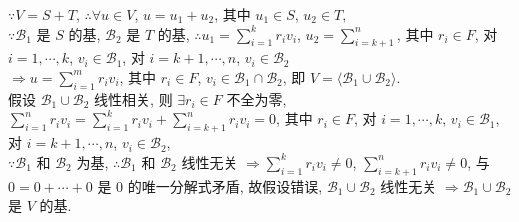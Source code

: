 \documentclass{note}
\begin{document}
\begin{pf}
\begin{itemize}
        $\because V=S+T$, $\therefore\forall u\in V$, $u=u_1+u_2$, 其中 $u_1\in S$, $u_2\in T$,\\
        $\because\mathcal{B}_1$ 是 $S$ 的基, $\mathcal{B}_2$ 是 $T$ 的基, $\therefore u_1=\sum_{i=1}^kr_iv_i$, $u_2=\sum_{i=k+1}^n$, 其中 $r_i\in F$, 对 $i=1,\cdots,k$, $v_i\in\mathcal{B}_1$, 对 $i=k+1,\cdots,n$, $v_i\in\mathcal{B}_2$\\
        $\Longrightarrow u=\sum_{i=1}^mr_iv_i$, 其中 $r_i\in F$, $v_i\in\mathcal{B}_1\cap\mathcal{B}_2$, 即 $V=\langle\mathcal{B}_1\cup\mathcal{B}_2\rangle$.\\
        假设 $\mathcal{B}_1\cup\mathcal{B}_2$ 线性相关, 则 $\exists r_i\in F$ 不全为零, $\sum_{i=1}^nr_iv_i=\sum_{i=1}^kr_iv_i+\sum_{i=k+1}^nr_iv_i=0$, 其中 $r_i\in F$, 对 $i=1,\cdots,k$, $v_i\in\mathcal{B}_1$, 对 $i=k+1,\cdots,n$, $v_i\in\mathcal{B}_2$,\\
        $\because\mathcal{B}_1$ 和 $\mathcal{B}_2$ 为基, $\therefore\mathcal{B}_1$ 和 $\mathcal{B}_2$ 线性无关 $\Longrightarrow\sum_{i=1}^kr_iv_i\neq 0$, $\sum_{i=k+1}^nr_iv_i\neq 0$, 与 $0=0+\cdots+0$ 是 $0$ 的唯一分解式矛盾, 故假设错误, $\mathcal{B}_1\cup\mathcal{B}_2$ 线性无关 $\Longrightarrow\mathcal{B}_1\cup\mathcal{B}_2$ 是 $V$ 的基.
    \end{itemize}
\end{pf}
\end{document}
